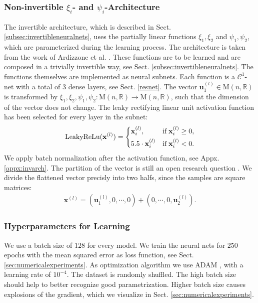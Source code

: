 \documentclass[envcountsect,runningheads]{llncs}
\begin{document}
\subsubsection{Non-invertible $\xi_i$- and $\psi_i$-Architecture}
The invertible architecture, which is described in Sect. \ref{subsec:invertibleneuralnets}, uses the partially linear functions $\xi_1,\xi_2$ and $\psi_1,\psi_2$, which are parameterized during the learning process. The architecture is taken from the work of Ardizzone et al. \cite{ArdizzoneKRK19}. These functions are to be learned and are composed in a trivially invertible way, see Sect. \ref{subsec:invertibleneuralnets}. The functions themselves are implemented as neural subnets. Each function is a $\mathcal{C}^1$-net with a total of $3$ dense layers, see Sect. \ref{resnet}. The vector $\mathbf{u}_{1}^{(l)} \in \text{M}(n,\mathbb{R})$ is transformed by $\xi_1,\xi_2,\psi_1,\psi_2: \text{M}(n,\mathbb{R}) \rightarrow \text{M}(n,\mathbb{R})$, such that the dimension of the vector does not change. The leaky rectifying linear unit activation function has been selected for every layer in the subnet:
\begin{align}
	\text{LeakyReLu}(\mathbf{x}^{(l)}) = 
	\begin{dcases}
	    \mathbf{x}^{(l)}_{i},
	    & \text{if} \; \mathbf{x}^{(l)}_{i} \geq 0, \\
	    5.5 \cdot \mathbf{x}^{(l)}_{i}
	    & \text{if} \; \mathbf{x}^{(l)}_{i} < 0.
	\end{dcases}
\end{align}
We apply batch normalization after the activation function, see Appx. \ref{appx:invarch}. The partition of the vector is still an open research question \cite{ArdizzoneKRK19}. We divide the flattened vector precisly into two halfs, since the samples are square matrices:
\begin{align}
\mathbf{x}^{(l)} = (\mathbf{u}^{(l)}_1, 0, \cdots, 0) + (0, \cdots, 0, \mathbf{u}^{(l)}_2).
\end{align}

\subsubsection{Hyperparameters for Learning} We use a batch size of $128$ for every model. We train the neural nets for $250$ epochs with the mean squared error as loss function, see Sect. \ref{sec:numericalexperiments}. As optimization algorithm we use ADAM \cite{KingmaB14}, with a learning rate of $10^{-4}$. The dataset is randomly shuffled. The high batch size should help to better recognize good parametrization. Higher batch size causes explosions of the gradient, which we visualize in Sect. \ref{sec:numericalexperiments}.


\renewcommand{\refname}{References for Appendices}

\end{document}
